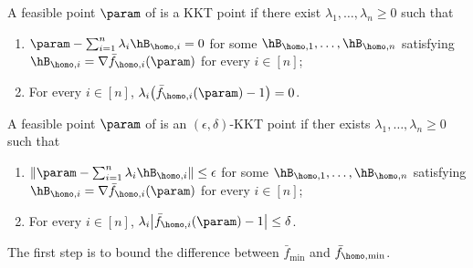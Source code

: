 \begin{definition}
\label{def: KKT point of (P)}
A feasible point $\param$ of  is a KKT point if there exist $\lambda_1,\ldots ,\lambda_n \ge 0$ such that 
\begin{enumerate}
    \item  $\param- \sum_{i=1}^n \lambda_i \hB_{\homo,i} =0$ for some $\hB_{\homo,1},\ldots ,\hB_{\homo,n}$ satisfying $\hB_{\homo,i}=  \nabla \bar f_{\homo,i}(\param)$ for every $i\in [n]$;
    \item For every $i\in [n]$, $\lambda_i \big(\bar f_{\homo,i}(\param) -1 \big) =0$. 
\end{enumerate}
\end{definition}

\begin{definition}
\label{def: approx KKT point of (P)}
A feasible point $\param$ of  is an $(\epsilon, \delta)$-KKT point if ther exists $\lambda_1,\ldots ,\lambda_n \ge 0$ such that 
\begin{enumerate}
    \item  $\|\param- \sum_{i=1}^n \lambda_i \hB_{\homo,i} \| \le \epsilon $ for some $\hB_{\homo,1},\ldots ,\hB_{\homo,n}$ satisfying $\hB_{\homo,i}= \nabla \bar f_{\homo,i}(\param)$ for every $i\in [n]$;
    \item For every $i\in [n]$, $\lambda_i  \big | \bar f_{\homo,i}(\param) -1 \big | \le \delta $. 
\end{enumerate}
\end{definition}
The first step is to bound the difference between $\bar f_{\min}$ and $ \bar f_{\homo,\min}$.


